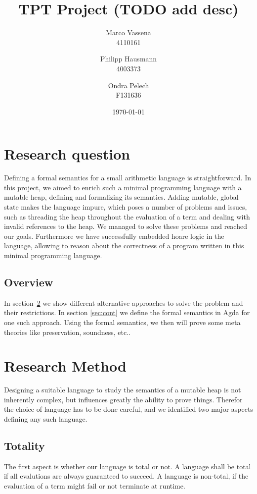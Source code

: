 \documentclass[12pt, a4paper, oneside]{article}
\title{TPT Project (TODO add desc)}
\author{Marco Vassena  \\
    4110161 \\
    \and
    Philipp Hausmann \\
    4003373 \\
    \and
    Ondra Pelech \\
    F131636 \\
    }
\date{\today}
\begin{document}
\maketitle

\tableofcontents


\section{Research question}
Defining a formal semantics for a small arithmetic language is straightforward. In this project, we aimed to enrich such a minimal programming language with a mutable heap, defining and formalizing its semantics. Adding mutable, global state makes the language impure, which  poses a number of problems and issues, such as threading the heap throughout the evaluation of a term and dealing with invalid references to the heap. 
We managed to solve these problems and reached our goals. Furthermore we have successfully embedded hoare logic in the language, allowing to reason about the correctness of a program written in this minimal programming language.

\subsection{Overview}
In section~\ref{sec:method} we show different alternative approaches to solve the problem and their restrictions. 
In section \ref{sec:cont} we define the formal semantics in Agda for one such approach.
Using the formal semantics, we then will prove some meta theories like preservation, soundness, etc..




\section{Research Method}
\label{sec:method}
Designing a suitable language to study the semantics of a mutable heap is not inherently complex, but influences greatly
the ability to prove things. Therefor the choice of language has to be done careful, and we identified two
major aspects defining any such language.

\subsection{Totality}
The first aspect is whether our language is total or not. A language shall be total if all evalutions
are always guaranteed to succeed. A language is non-total, if the evaluation of a term might fail or not terminate at runtime.
\end{document}

